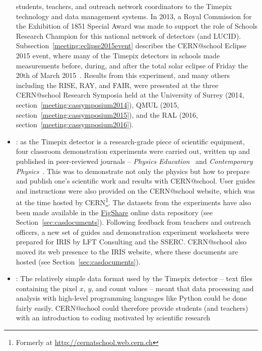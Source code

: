 \begin{itemize}
students, teachers, and outreach network coordinators
to the Timepix technology and data management systems.
%
In 2013, a Royal Commission for the Exhibition of 1851
Special Award was made to support the role of
Schools Research Champion for this national network of
detectors (and \ac{LUCID}).
%
Subsection~\ref{meeting:eclipse2015event} describes the
CERN@school Eclipse 2015 event, where many of the Timepix
detectors in schools made measurements before, during, and
after the total solar eclipse of Friday the 20th of March
2015~\cite{Whyntie2016a}.
%
Results from this experiment, and many others including
the \ac{RISE}, \ac{RAY}, and \ac{FAIR}, were presented at the
three CERN@school Research Symposia held at
the University of Surrey (2014, section~\ref{meeting:cassymposium2014}),
\acl{QMUL} (2015, section~\ref{meeting:cassymposium2015}),
and
the \acl{RAL} (2016, section~\ref{meeting:cassymposium2016}).
%
\item {}:
as the Timepix detector is a research-grade piece of scientific
equipment, four classroom demonstration experiments were carried out,
written up and published in peer-reviewed journals -- {\em Physics
Education}~\cite{Whyntie2013} and
{\em Contemporary Physics}~\cite{Whyntie2015b}.
This was to demonstrate not only the physics but how to prepare
and publish one's scientific work and results with CERN@school.
User guides and instructions were also provided on the 
CERN@school website, which was at the time hosted by \acs{CERN}\footnote{%
Formerly at \href{http://cernatschool.web.cern.ch}{http://cernatschool.web.cern.ch}}.
The datasets from the experiments have also been made available
in the \href{http://fighare.com}{FigShare} online data repository
(see Section~\ref{sec:casdocuments}).
Following feedback from teachers and outreach officers,
a new set of guides and demonstration experiment worksheets were
prepared for \acs{IRIS} by LFT Consulting and the \acf{SSERC}.
CERN@school also moved its web presence to the \acs{IRIS} website,
where these documents are hosted (see Section~\ref{sec:casdocuments}).
%
\item {}:
The relatively simple data format used by the Timepix detector -- 
text files containing the pixel $x$, $y$, and count values -- meant
that data processing and analysis with high-level programming languages like
Python could be done fairly easily.
CERN@school could therefore provide students (and teachers) with an
introduction to coding motivated by scientific research

\end{itemize}
